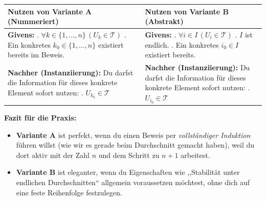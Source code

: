 \documentclass{article}
\begin{document}
\begin{center}
\small
\begin{tabular}{ L{0.45\textwidth} | L{0.45\textwidth} }
\toprule
\textbf{Nutzen von Variante A (Nummeriert)} & \textbf{Nutzen von Variante B (Abstrakt)} \\
\midrule
\textbf{Givens:} . $\forall k \in \{1, \dots, n\} \, (U_k \in \mathcal{T})$ . Ein konkretes $k_0 \in \{1, \dots, n\}$ existiert bereits im Beweis. &
\textbf{Givens:} . $\forall i \in I \, (U_i \in \mathcal{T})$ . $I$ ist endlich. . Ein konkretes $i_0 \in I$ existiert bereits. \\
\hline
\textbf{Nachher (Instanziierung):} \newline
Du darfst die Information für dieses konkrete Element sofort nutzen: . $U_{k_0} \in \mathcal{T}$ &
\textbf{Nachher (Instanziierung):} \newline
Du darfst die Information für dieses konkrete Element sofort nutzen: . $U_{i_0} \in \mathcal{T}$ \\
\bottomrule
\end{tabular}
\end{center}

\vspace{1em}
\textbf{Fazit für die Praxis:}
\begin{itemize}
    \item \textbf{Variante A} ist perfekt, wenn du einen Beweis per \emph{vollständiger Induktion} führen willst (wie wir es gerade beim Durchschnitt gemacht haben), weil du dort aktiv mit der Zahl $n$ und dem Schritt zu $n+1$ arbeitest.
    \item \textbf{Variante B} ist eleganter, wenn du Eigenschaften wie ,,Stabilität unter endlichen Durchschnitten`` allgemein voraussetzen möchtest, ohne dich auf eine feste Reihenfolge festzulegen.
\end{itemize}
\end{document}
